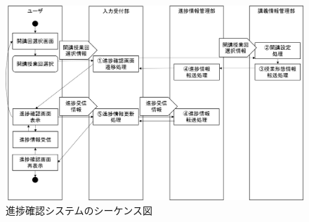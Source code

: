 \begin{figure}[htbp]
  \begin{center}
    \includegraphics[width=1\linewidth,clip]{./img/preg_check/main.png}
    \caption{進捗確認システムのシーケンス図}\label{fig:preg_checkseaquence}
  \end{center}
\end{figure}

